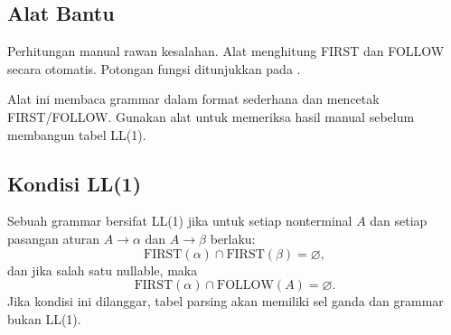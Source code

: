 \subsection{Alat Bantu}

Perhitungan manual rawan kesalahan. Alat 
menghitung FIRST dan FOLLOW secara otomatis. Potongan fungsi
 ditunjukkan pada .


Alat ini membaca grammar dalam format sederhana dan mencetak
FIRST/FOLLOW. Gunakan alat untuk memeriksa hasil manual sebelum
membangun tabel LL(1).

\subsection{Kondisi LL(1)}

Sebuah grammar bersifat LL(1) jika untuk setiap nonterminal \(A\)
dan setiap pasangan aturan \(A \to \alpha\) dan \(A \to \beta\)
berlaku:
\[
\text{FIRST}(\alpha) \cap \text{FIRST}(\beta) = \varnothing,
\]
dan jika salah satu nullable, maka
\[
\text{FIRST}(\alpha) \cap \text{FOLLOW}(A) = \varnothing.
\]
Jika kondisi ini dilanggar, tabel parsing akan memiliki sel ganda
dan grammar bukan LL(1).
